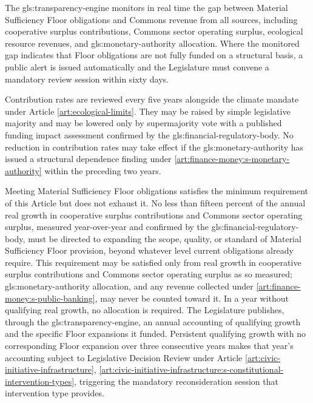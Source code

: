 The \gls{gls:transparency-engine} monitors in real time the gap between Material Sufficiency Floor obligations and Commons revenue from all sources, including cooperative surplus contributions, Commons sector operating surplus, ecological resource revenues, and \gls{gls:monetary-authority} allocation. Where the monitored gap indicates that Floor obligations are not fully funded on a structural basis, a public alert is issued automatically and the Legislature must convene a mandatory review session within sixty days.

Contribution rates are reviewed every five years alongside the climate mandate under Article \ref{art:ecological-limits}. They may be raised by simple legislative majority and may be lowered only by supermajority vote with a published funding impact assessment confirmed by the \gls{gls:financial-regulatory-body}. No reduction in contribution rates may take effect if the \gls{gls:monetary-authority} has issued a structural dependence finding under \ref{art:finance-money:s-monetary-authority} within the preceding two years.

Meeting Material Sufficiency Floor obligations satisfies the minimum requirement of this Article but does not exhaust it. No less than fifteen percent of the annual real growth in cooperative surplus contributions and Commons sector operating surplus, measured year-over-year and confirmed by the \gls{gls:financial-regulatory-body}, must be directed to expanding the scope, quality, or standard of Material Sufficiency Floor provision, beyond whatever level current obligations already require. This requirement may be satisfied only from real growth in cooperative surplus contributions and Commons sector operating surplus as so measured; \gls{gls:monetary-authority} allocation, and any revenue collected under \ref{art:finance-money:s-public-banking}, may never be counted toward it. In a year without qualifying real growth, no allocation is required. The Legislature publishes, through the \gls{gls:transparency-engine}, an annual accounting of qualifying growth and the specific Floor expansions it funded. Persistent qualifying growth with no corresponding Floor expansion over three consecutive years makes that year's accounting subject to Legislative Decision Review under Article \ref{art:civic-initiative-infrastructure}, \ref{art:civic-initiative-infrastructure:s-constitutional-intervention-types}, triggering the mandatory reconsideration session that intervention type provides.

